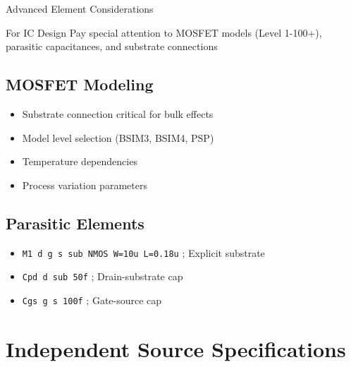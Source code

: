 \documentclass{beamer}
\begin{document}
\begin{frame}{Advanced Element Considerations}
    \begin{alertblock}{For IC Design}
        Pay special attention to MOSFET models (Level 1-100+), parasitic capacitances, and substrate connections
    \end{alertblock}
    
    \subsection{MOSFET Modeling}
    \begin{itemize}
        \item Substrate connection critical for bulk effects
        \item Model level selection (BSIM3, BSIM4, PSP)
        \item Temperature dependencies
        \item Process variation parameters
    \end{itemize}
    
    \subsection{Parasitic Elements}
    \begin{itemize}
        \item \texttt{M1 d g s sub NMOS W=10u L=0.18u} ; Explicit substrate
        \item \texttt{Cpd d sub 50f} ; Drain-substrate cap
        \item \texttt{Cgs g s 100f} ; Gate-source cap
    \end{itemize}
\end{frame}

\section{Independent Source Specifications}
\end{document}
